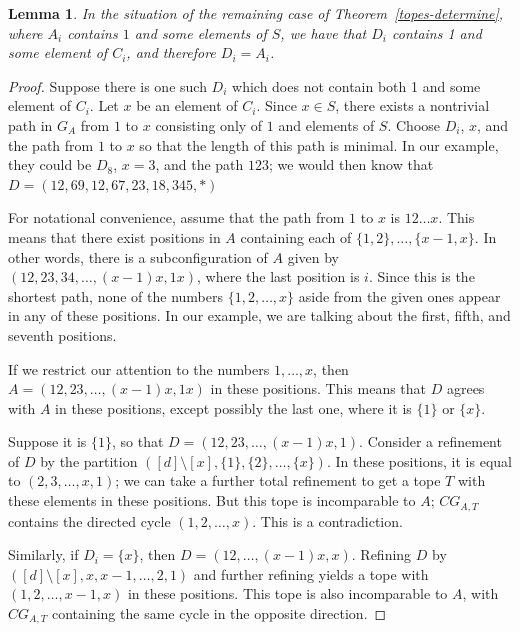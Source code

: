 \documentclass[11pt]{amsart}
\newtheorem{lem}[thm]{Lemma}
\begin{document}
\begin{lem}
In the situation of the remaining case of Theorem~\ref{topes-determine}, where $A_i$ contains $1$ and some elements of $S$, we have that 
$D_i$ contains 1 and some element of $C_i$, and therefore $D_i = A_i$. 
\end{lem}

\begin{proof}
Suppose there is one such $D_i$ which does not contain both 
1 and some element of $C_i$. Let $x$ be an element of $C_i$. Since $x\in S$, there exists a nontrivial path in $G_A$ from $1$ to $x$ 
consisting only of $1$ and elements of $S$. Choose $D_i$, $x$, and the path from $1$ to $x$ so that the length of this path is minimal. In our example, they could be $D_8$, $x=3$, and the path $123$; we would then know that $D=(12,69,12,67,23,18,345,*)$

For notational convenience, assume that the path from $1$ to $x$ is $12\ldots x$. This means that there exist positions in $A$ containing each of $\{1, 2\}, \ldots, \{x-1, x\}$. In other words, there is a subconfiguration of $A$ given by $(12, 23, 34, 
\ldots, (x-1)x, 1x)$, where the last position is $i$. Since this is the shortest path, none of the numbers $\{1,2, \ldots, x\}$ aside from the given ones appear in any of these positions. In our example, we are talking about the first, fifth, and seventh positions.

If we restrict our attention to the numbers $1, \ldots, x$, then $A = (12, 23, \ldots, (x-1)x, 1x)$ in these positions. This
means that $D$ agrees with $A$ in these positions, except possibly the last one, where it is $\{1\}$ or $\{x\}$. 

Suppose it is $\{1\}$, so that $D = (12, 23, \ldots, (x-1)x, 1)$. Consider a refinement of $D$ by the partition $([d]\setminus 
[x], \{1\}, \{2\}, \ldots, \{x\})$. In these positions, it is equal to $(2, 3, \ldots, x, 1)$; we can take a further total 
refinement to get a tope $T$ with these elements in these positions. But this tope is incomparable to $A$; $CG_{A, T}$ contains the 
directed cycle $(1, 2, \ldots, x)$. This is a contradiction.

Similarly, if $D_i = \{x\}$, then $D = (12, \ldots, (x-1)x, x)$. Refining $D$ by $([d]\setminus [x], x, x-1, \ldots, 2, 
1)$ and further refining yields a tope with $(1, 2, \ldots, x-1, x)$ in these positions. This tope is also incomparable to 
$A$, with $CG_{A, T}$ containing the same cycle in the opposite direction. 
\end{proof}
\end{document}
